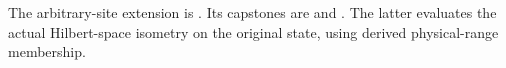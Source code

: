 \documentclass{article}
\begin{document}
The arbitrary-site extension is
. Its capstones are
 and
.
The latter evaluates the actual Hilbert-space isometry on the original
state, using derived physical-range membership.
\end{document}
